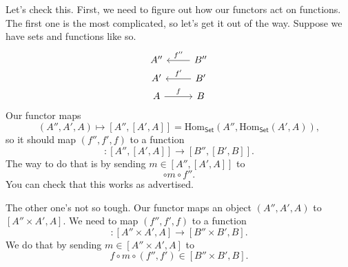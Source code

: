 \documentclass[a4paper]{report}
\newcommand{\Hom}{\mathrm{Hom}}
\theoremstyle{definition}
\theoremstyle{plain}
\theoremstyle{remark}
\begin{document}
Let's check this. First, we need to figure out how our functors act on functions. The first one is the most complicated, so let's get it out of the way. Suppose we have sets and functions like so.
\begin{equation*}
  \begin{tikzcd}[row sep=tiny]
    A''
    & B''
    \arrow[l, swap, "f''"]
    \\
    A'
    & B'
    \arrow[l, swap, "f'"]
    \\
    A 
    \arrow[r, "f"]
    & B
  \end{tikzcd}
\end{equation*}
Our functor maps
\begin{equation*}
  (A'', A', A) \mapsto [A'', [A', A]] = \Hom_{\mathsf{Set}}(A'', \Hom_{\mathsf{Set}}(A', A)),
\end{equation*}
so it should map $(f'', f', f)$ to a function
\begin{equation*}
  [f'', [f', f]\colon [A'', [A', A]] \to [B'', [B', B]].
\end{equation*}
The way to do that is by sending $m \in [A'', [A', A]]$ to 
\begin{equation*}
  [f', f] \circ m \circ f''.
\end{equation*}
You can check that this works as advertised.

The other one's not so tough. Our functor maps an object $(A'', A', A)$ to $[A'' \times A', A]$. We need to map $(f'', f', f)$ to a function
\begin{equation*}
  [f'' \times f' , f]\colon [A'' \times A', A] \to [B'' \times B', B].
\end{equation*}
We do that by sending $m \in [A'' \times A', A]$ to
\begin{equation*}
  f \circ m \circ (f'', f') \in [B'' \times B', B].
\end{equation*}
\end{document}
